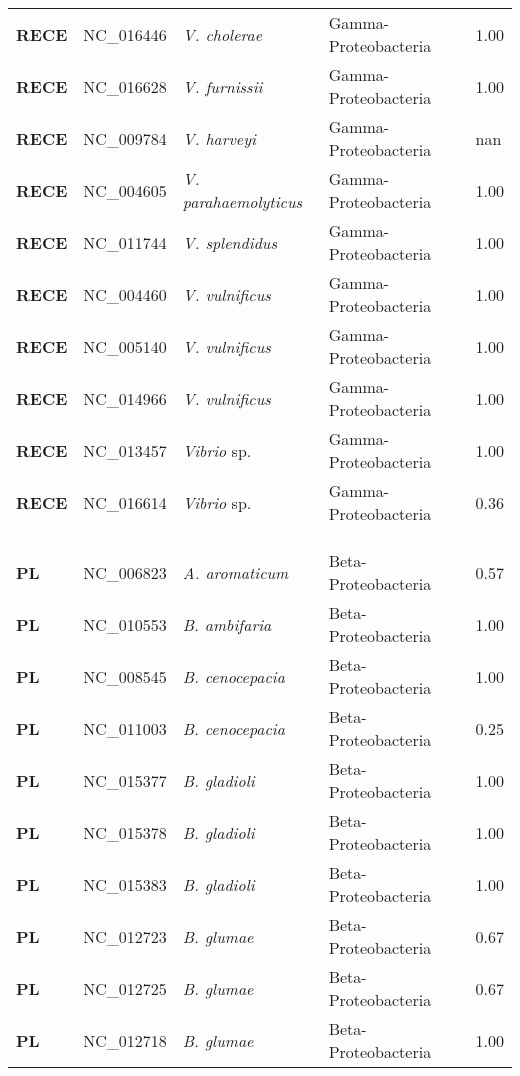 \begin{adjustwidth}{-3cm}{2cm}
{\begin{supertabular}{>{\bfseries}l|p{0.1\textwidth}p{0.14\textwidth}l|l}
RECE & NC\_016446 & \textit{V. cholerae} & Gamma-Proteobacteria & 1.00\\
RECE & NC\_016628 & \textit{V. furnissii} & Gamma-Proteobacteria & 1.00\\
RECE & NC\_009784 & \textit{V. harveyi} & Gamma-Proteobacteria & nan\\
RECE & NC\_004605 & \textit{V. parahaemolyticus} & Gamma-Proteobacteria & 1.00\\
RECE & NC\_011744 & \textit{V. splendidus} & Gamma-Proteobacteria & 1.00\\
RECE & NC\_004460 & \textit{V. vulnificus} & Gamma-Proteobacteria & 1.00\\
RECE & NC\_005140 & \textit{V. vulnificus} & Gamma-Proteobacteria & 1.00\\
RECE & NC\_014966 & \textit{V. vulnificus} & Gamma-Proteobacteria & 1.00\\
RECE & NC\_013457 & \textit{Vibrio} sp. & Gamma-Proteobacteria & 1.00\\
RECE & NC\_016614 & \textit{Vibrio} sp. & Gamma-Proteobacteria & 0.36\\
\\
\\
\hline\\
PL & NC\_006823 & \textit{A. aromaticum} & Beta-Proteobacteria & 0.57\\
PL & NC\_010553 & \textit{B. ambifaria} & Beta-Proteobacteria & 1.00\\
PL & NC\_008545 & \textit{B. cenocepacia} & Beta-Proteobacteria & 1.00\\
PL & NC\_011003 & \textit{B. cenocepacia} & Beta-Proteobacteria & 0.25\\
PL & NC\_015377 & \textit{B. gladioli} & Beta-Proteobacteria & 1.00\\
PL & NC\_015378 & \textit{B. gladioli} & Beta-Proteobacteria & 1.00\\
PL & NC\_015383 & \textit{B. gladioli} & Beta-Proteobacteria & 1.00\\
PL & NC\_012723 & \textit{B. glumae} & Beta-Proteobacteria & 0.67\\
PL & NC\_012725 & \textit{B. glumae} & Beta-Proteobacteria & 0.67\\
PL & NC\_012718 & \textit{B. glumae} & Beta-Proteobacteria & 1.00\\

\end{supertabular}}
\end{adjustwidth}
